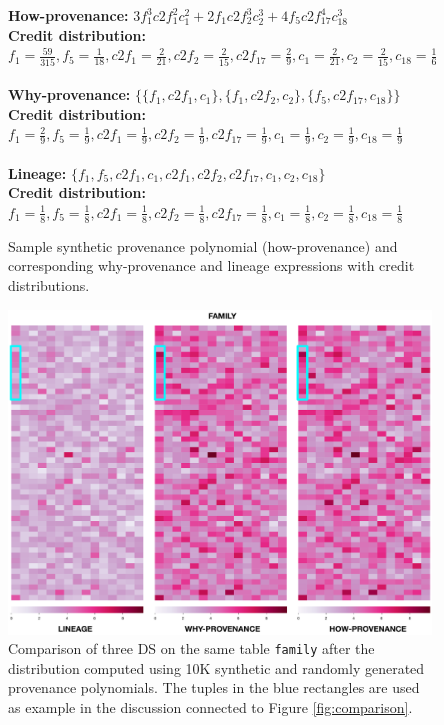 \begin{figure}
{\footnotesize{\bf How-provenance:}
$
3 f_1^3 c2f_1^2 c_1^2 + 2 f_1 c2f_2^3 c_2^3 + 4 f_5 c2f_{17}^4 c_{18}^3
$ }\\
\hspace{0.5in} 
{\footnotesize{\bf Credit distribution:}\\ $f_1 = \frac{59}{315}, f_5 = \frac{1}{18}, c2f_1 = \frac{2}{21}, c2f_2 = \frac{2}{15}, 
c2f_{17}=\frac{2}{9} , c_1 = \frac{2}{21}, c_2 = \frac{2}{15}, c_{18} = \frac{1}{6} 
$
}
\\
\\
{\footnotesize{\bf Why-provenance:}
$
\{ \{f_1, c2f_1, c_1\}, \{f_1, c2f_2, c_2\}, \{ f_5, c2f_{17}, c_{18}\} \}
$ 
}
\\
{\footnotesize{\bf Credit distribution:}\\
$
f_1 = \frac{2}{9}, f_5 = \frac{1}{9}, c2f_1 = \frac{1}{9}, c2f_2 = \frac{1}{9}, 
c2f_{17}=\frac{1}{9} , c_1 = \frac{1}{9}, c_2 = \frac{1}{9}, c_{18} = \frac{1}{9} 
$
}
\\
\\
{\footnotesize{\bf Lineage: }
$
\{f_1, f_5, c2f_1, c_1, c2f_1, c2f_2, c2f_{17}, c_1, c_2, c_{18} \}
$}
\\
{\footnotesize{\bf Credit distribution:}\\
$
f_1 = \frac{1}{8}, f_5 = \frac{1}{8}, c2f_1 = \frac{1}{8}, c2f_2 = \frac{1}{8}, 
c2f_{17}=\frac{1}{8} , c_1 = \frac{1}{8}, c_2 = \frac{1}{8}, c_{18} = \frac{1}{8} 
$}
 \caption{Sample synthetic provenance polynomial (how-provenance) and corresponding why-provenance and lineage expressions with credit distributions.}
 \label{fig:syntheticDistributions}
 \end{figure}

\begin{figure}[tb]
  \includegraphics[width=1\textwidth]{figures/experiments/synthetic_comparison}
  \caption{Comparison of three DS on the same table \texttt{family} after the distribution computed using 10K synthetic and randomly generated provenance polynomials. The tuples in the blue rectangles are used as example in the discussion connected to Figure \ref{fig:comparison}.}
  \label{figure:comparison_on_synthetic_polynomials_2}
\end{figure}

